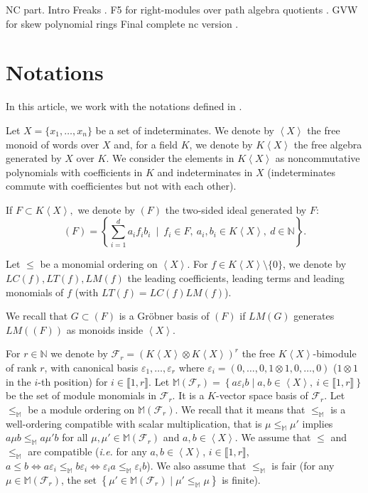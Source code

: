 \documentclass[sigconf]{acmart}
\theoremstyle{plain}
\theoremstyle{definition}
\theoremstyle{remark}
\newcommand{\NN}{\mathbb N}
\newcommand{\MM}{\mathbb M}
\newcommand{\LT}{LT}
\newcommand{\LC}{LC}
\newcommand{\LM}{LM}
\newcommand{\KX}{K \left\langle X \right\rangle}
\begin{document}
NC part.
Intro \cite{Mora94}
Freaks \cite{GMU00}.
F5 for right-modules over path algebra quotients \cite{K14}.
GVW for skew polynomial rings \cite{ZZ15}
Final complete
nc version \cite{HV21}.

\section{Notations}

In this article,
we work with
the notations defined
in \cite{HV21}.



Let $X= \{ x_1,\dots,x_n \}$
be a set of indeterminates.
We denote by $\left\langle X \right\rangle$ the
free monoid of words 
over $X$ and, for a field
$K$, we denote by
$\KX$ the
free algebra generated by $X$
over $K.$
We consider the elements
in $\KX$
as noncommutative polynomials
with coefficients in $K$
and indeterminates in $X$
(indeterminates commute
with coefficientes but not
with each other).

If $F \subset \KX,$
we denote by $(F)$
the two-sided ideal 
generated by $F$:
\[(F) = \left\lbrace \sum_{i=1}^d a_i f_i b_i \: \mid \: f_i \in F, \: a_i,b_i \in \KX, \: d \in \NN  \right\rbrace. \]

Let $\leq$ be a monomial 
ordering on $\left\langle X \right\rangle$.
For $f \in \KX \setminus \{ 0 \}$, we denote by $\LC (f), \LT (f), \LM (f)$
the leading coefficients,
leading terms and 
leading monomials of $f$
(with $\LT(f) = \LC(f) \LM(f)$).

We recall that $G \subset (F)$
is a Gröbner basis
of $(F)$ if
$\LM (G)$ generates $LM\left( (F) \right)$ as
monoids inside $\left\langle X \right\rangle.$

For $r \in \NN$ we denote
by $\mathscr{F}_r = \left( \KX \otimes \KX \right)^r$
the free $\KX$-bimodule
of rank $r$, with canonical
basis $\varepsilon_1,\dots,\varepsilon_r$
where $\varepsilon_i =(0,\dots,0,1 \otimes 1,0,\dots,0)$ ($1 \otimes 1$ in the $i$-th position) for $i \in \llbracket 1,r \rrbracket.$
Let $\MM \left( \mathscr{F}_r \right)= \left\lbrace a \varepsilon_i b \mid a,b \in \left\langle X \right\rangle, \: i \in \llbracket 1,r\rrbracket \right\rbrace$
be the set of module monomials in $\mathscr{F}_r.$ It is a $K$-vector space basis
of $\mathscr{F}_r.$
Let $\leq_\MM$ be a module
ordering on $\MM \left( \mathscr{F}_r \right).$
We recall that it means that
$\leq_\MM$ is a well-ordering
compatible with 
scalar multiplication, that
is 
$\mu \leq_\MM \mu'$ implies
$a \mu b \leq_\MM a \mu' b$
for all $\mu,\mu' \in \MM \left( \mathscr{F}_r \right)$
and $a, b \in \left\langle X \right\rangle.$
We assume that 
$\leq$ and $\leq_\MM$
are compatible
(\textit{i.e.} for any
$a,b \in \left\langle X \right\rangle$, $i \in \llbracket 1,r \rrbracket$,
$a \leq b \Leftrightarrow a \varepsilon_i \leq_\MM b \varepsilon_i \Leftrightarrow \varepsilon_i a \leq_\MM \varepsilon_i b$).
We also assume that 
$\leq_\MM$ is fair (for any
$\mu \in \MM (\mathscr{F}_r)$,
the set $\left\lbrace \mu' \in \MM (\mathscr{F}_r) \mid \mu' \leq_\MM \mu \right\rbrace$ is finite).
\end{document}
